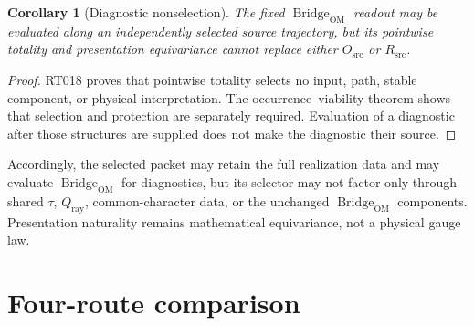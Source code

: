 \documentclass[11pt]{article}
\newtheorem{corollary}{Corollary}
\newcommand{\Rsrc}{R_{\mathrm{src}}}
\newcommand{\Osrc}{O_{\mathrm{src}}}
\newcommand{\Bridge}{\operatorname{Bridge}_{\mathrm{OM}}}
\begin{document}
\begin{corollary}[Diagnostic nonselection]
The fixed $\Bridge$ readout may be evaluated along an independently selected
source trajectory, but its pointwise totality and presentation equivariance
cannot replace either $\Osrc$ or $\Rsrc$.
\end{corollary}

\begin{proof}
RT018 proves that pointwise totality selects no input, path, stable component,
or physical interpretation.  The occurrence--viability theorem shows that
selection and protection are separately required.  Evaluation of a
diagnostic after those structures are supplied does not make the diagnostic
their source.
\end{proof}

Accordingly, the selected packet may retain the full realization data and may
evaluate $\Bridge$ for diagnostics, but its selector may not factor only
through shared $\tau$, $Q_{\mathrm{ray}}$, common-character data, or the
unchanged $\Bridge$ components.  Presentation naturality remains mathematical
equivariance, not a physical gauge law.

\section{Four-route comparison}
\end{document}
